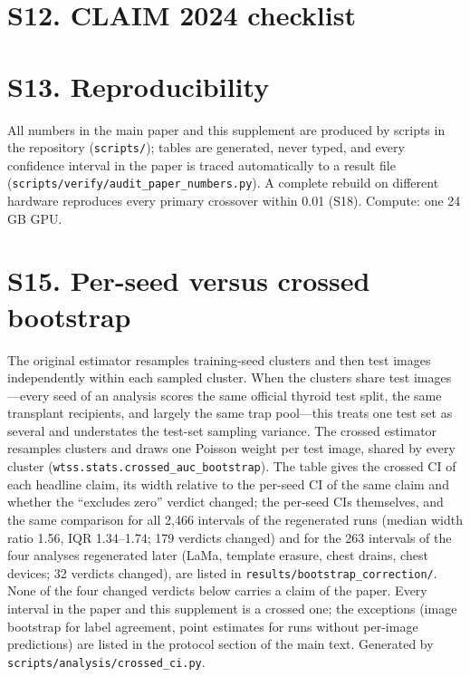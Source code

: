 \documentclass[review,3p]{elsarticle}
\begin{document}
\section*{S12. CLAIM 2024 checklist}\label{supp:S12}


\section*{S13. Reproducibility}\label{supp:S13}
All numbers in the main paper and this supplement are produced by scripts in the repository (\texttt{scripts/});
tables are generated, never typed, and every confidence interval in the paper is traced automatically to a result
file (\texttt{scripts/verify/audit\_paper\_numbers.py}). A complete rebuild on different hardware reproduces every
primary crossover within 0.01 (S18). Compute: one 24\,GB GPU.



\section*{S15. Per-seed versus crossed bootstrap}\label{supp:S15}
The original estimator resamples training-seed clusters and then test images independently within each sampled cluster.
When the clusters share test images---every seed of an analysis scores the same official thyroid test split, the same
transplant recipients, and largely the same trap pool---this treats one test set as several and understates the
test-set sampling variance. The crossed estimator resamples clusters and draws one Poisson weight per test image, shared
by every cluster (\texttt{wtss.stats.crossed\_auc\_bootstrap}). The table gives the crossed CI of each headline claim,
its width relative to the per-seed CI of the same claim and whether the ``excludes zero'' verdict changed; the per-seed
CIs themselves, and the same comparison for all 2,466 intervals of the regenerated runs (median width ratio 1.56, IQR
1.34--1.74; 179 verdicts changed) and for the 263 intervals of the four analyses regenerated later (LaMa, template
erasure, chest drains, chest devices; 32 verdicts changed), are listed in \texttt{results/bootstrap\_correction/}. None of the four changed
verdicts below carries a claim of the paper. Every interval in the paper and this supplement is a crossed one; the
exceptions (image bootstrap for label agreement, point estimates for runs without per-image predictions) are listed in
the protocol section of the main text. Generated by \texttt{scripts/analysis/crossed\_ci.py}.

\end{document}
